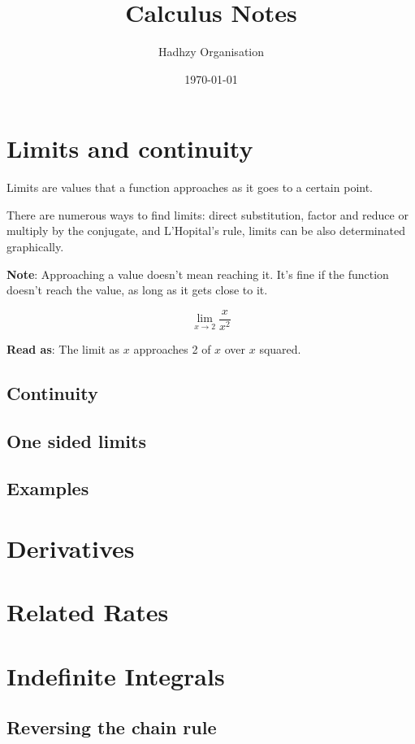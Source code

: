\documentclass[a4paper,12pt]{book}
\author{Hadhzy Organisation}
\title{Calculus Notes}
\date{\today}
\newcommand{\highlightmath}[1]{\begin{tcolorbox}[colback=yellow!10!white, colframe=red!50!black, boxrule=0.5mm]#1\end{tcolorbox}}
\begin{document}
\maketitle

\tableofcontents

\chapter{Limits and continuity}
Limits are values that a function approaches as it goes to a certain point. 

There are numerous ways to find limits: direct substitution, factor and reduce or multiply by the conjugate, and L'Hopital's rule, limits can be also determinated graphically.

\textbf{Note}: Approaching a value doesn't mean reaching it. It's fine if the function doesn't reach the value, as long as it gets close to it.

\highlightmath{
\[
\lim_{x \to 2} \frac{x}{x^2}
\]
}
\textbf{Read as}: The limit as \( x \) approaches 2 of \( x \) over \( x \) squared.

\section{Continuity}

\section{One sided limits}

\section{Examples}

\chapter{Derivatives}

\chapter{Related Rates}

\chapter{Indefinite Integrals}

\section{Reversing the chain rule}
\end{document}
